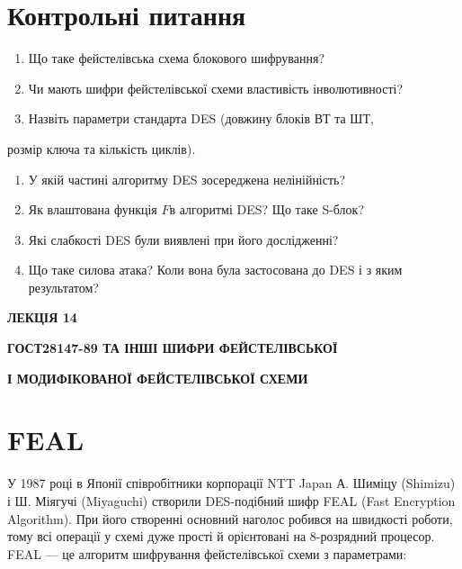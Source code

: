 {{{{{{{{{{{{{{{{{{\begin{definition}
{{{{{{{{{\bigskip

\section{Контрольні питання}


\bigskip


\bigskip

\liststyleWWviiiNumxviii
\begin{enumerate}
\item Що таке фейстелівська схема блокового шифрування? 
\item Чи мають шифри фейстелівської схеми властивість інволютивності?
\item Назвіть параметри стандарта DES (довжину блоків ВТ та ШТ, 
\end{enumerate}
розмір ключа та кількість циклів).

\liststyleWWviiiNumxviii
\setcounter{saveenum}{\value{enumi}}
\begin{enumerate}
\setcounter{enumi}{\value{saveenum}}
\item У якій частині алгоритму DES зосереджена нелінійність?
\item Як влаштована функція $F$в алгоритмі DES? Що таке
S{}-блок?
\item Які слабкості DES були виявлені при його дослідженні?
\item Що таке силова атака? Коли вона була застосована до DES і з яким
результатом?
\end{enumerate}

\bigskip


\bigskip

{\bfseries
ЛЕКЦІЯ  14}


\bigskip

{\centering\bfseries
ГОСТ28147-89  ТА ІНШІ ШИФРИ  ФЕЙСТЕЛІВСЬКОЇ 
\par}

{\centering\bfseries
І  МОДИФІКОВАНОЇ  ФЕЙСТЕЛІВСЬКОЇ  СХЕМИ
\par}


\bigskip


\bigskip

\section{FEAL}


\bigskip

У 1987 році в Японії співробітники корпорації NTT Japan А. Шиміцу (Shimizu) і Ш.
Міягучі (Miyaguchi) створили DES-подібний шифр FEAL (Fast Encryption
Algorithm). При його створенні основний наголос робився на швидкості роботи,
тому всі операції у схемі дуже прості й орієнтовані на 8-розрядний процесор.
FEAL  --- це алгоритм шифрування фейстелівської схеми з параметрами:

}}}}}}}}}
\end{definition}}}}}}}}}}}}}}}}}}}
